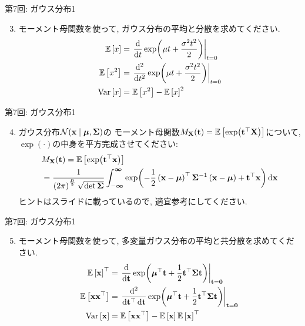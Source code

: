 \documentclass[dvipdfmx,notheorems,t]{beamer}
\begin{document}
\begin{frame}{第7回: ガウス分布1}
\begin{enumerate}
  \setcounter{enumi}{2}
  \item モーメント母関数を使って, ガウス分布の平均と分散を求めてください.
  \begin{align*}
    \operatorname{\mathbb{E}} \left[ x \right] &= \left. \dv{t} \exp(\mu t + \frac{\sigma^2 t^2}{2}) \right|_{t = 0} \\
    \operatorname{\mathbb{E}} \left[ x^2 \right] &= \left. \dv[2]{t} \exp(\mu t + \frac{\sigma^2 t^2}{2}) \right|_{t = 0} \\
    \operatorname{Var} \left[ x \right] &= \operatorname{\mathbb{E}} \left[ x^2 \right] - \operatorname{\mathbb{E}} \left[ x \right]^2
  \end{align*}
\end{enumerate}
\end{frame}

\begin{frame}{第7回: ガウス分布1}
\begin{enumerate}
  \setcounter{enumi}{3}
  \item ガウス分布$\mathcal{N}(\vb{x} \mid \vb*{\mu}, \vb{\Sigma})$の
  モーメント母関数$M_{\vb{X}}(\vb{t}) = \operatorname{\mathbb{E}} \left[ \exp(\vb{t}^\top \vb{X}) \right]$について,
  $\exp(\cdot)$の中身を平方完成させてください:
  \begin{align*}
    & M_{\vb{X}}(\vb{t}) = \operatorname{\mathbb{E}} \left[ \exp(\vb{t}^\top \vb{x}) \right] \\
    &= \frac{1}{\left( 2\pi \right)^\frac{D}{2} \sqrt{\det \vb{\Sigma}}}
      \int_{-\boldsymbol{\infty}}^{\boldsymbol{\infty}}
      \exp(-\frac{1}{2} \left( \vb{x} - \vb*{\mu} \right)^\top \vb{\Sigma}^{-1}
        \left( \vb{x} - \vb*{\mu} \right) + \vb{t}^\top \vb{x}) \dd{\vb{x}}
  \end{align*}
  ヒントはスライドに載っているので, 適宜参考にしてください.
\end{enumerate}
\end{frame}

\begin{frame}{第7回: ガウス分布1}
\begin{enumerate}
  \setcounter{enumi}{4}
  \item モーメント母関数を使って, 多変量ガウス分布の平均と共分散を求めてください.
  \begin{align*}
    \operatorname{\mathbb{E}} \left[ \vb{x} \right]^\top
    &= \left. \dv{\vb{t}} \exp(\vb*{\mu}^\top \vb{t} + \frac{1}{2} \vb{t}^\top \vb{\Sigma} \vb{t})
      \right|_{\vb{t} = \vb{0}} \\
    \operatorname{\mathbb{E}} \left[ \vb{x} \vb{x}^\top \right]
    &= \left. \frac{\dd[2]}{\dd{\vb{t}^\top} \dd{\vb{t}}}
      \exp(\vb*{\mu}^\top \vb{t} + \frac{1}{2} \vb{t}^\top \vb{\Sigma} \vb{t})
      \right|_{\vb{t} = \vb{0}} \\
    \operatorname{Var} \left[ \vb{x} \right] &= \operatorname{\mathbb{E}} \left[ \vb{x} \vb{x}^\top \right] - \operatorname{\mathbb{E}} \left[ \vb{x} \right] \operatorname{\mathbb{E}} \left[ \vb{x} \right]^\top
  \end{align*}
\end{enumerate}
\end{frame}
\end{document}
